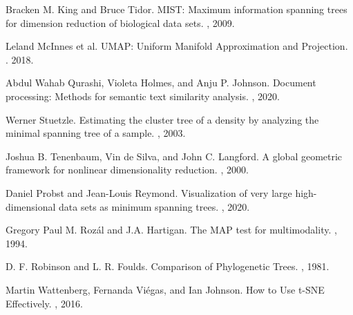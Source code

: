 \documentclass{article}
\begin{document}
\begin{thebibliography}{10}
Bracken M. King and Bruce Tidor.
\newblock MIST: Maximum information spanning trees for dimension reduction of biological data sets.
, 2009.

Leland McInnes et al.
\newblock UMAP: Uniform Manifold Approximation and Projection.
. 2018.

Abdul Wahab Qurashi, Violeta Holmes, and Anju P. Johnson.
\newblock Document processing: Methods for semantic text similarity analysis.
, 2020.

Werner Stuetzle.
\newblock Estimating the cluster tree of a density by analyzing the minimal spanning tree of a sample.
, 2003.

Joshua B. Tenenbaum, Vin de Silva, and John C. Langford.
\newblock A global geometric framework for nonlinear dimensionality reduction.
, 2000.

Daniel Probst and Jean-Louis Reymond.
\newblock Visualization of very large high-dimensional data sets as minimum spanning trees.
, 2020.

Gregory Paul M. Roz\'al and J.A. Hartigan.
\newblock The MAP test for multimodality.
, 1994.

D. F. Robinson and L. R. Foulds.
\newblock Comparison of Phylogenetic Trees.
, 1981.

Martin Wattenberg, Fernanda Vi\'egas, and Ian Johnson.
\newblock How to Use t-SNE Effectively.
, 2016.

\end{thebibliography}
\end{document}

